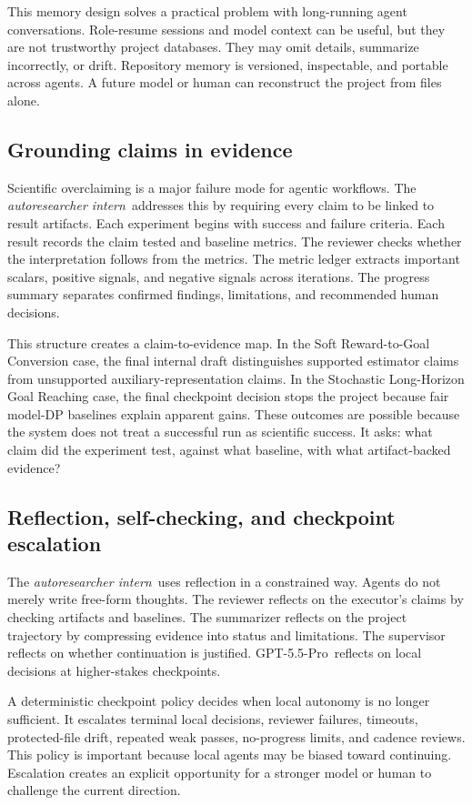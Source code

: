 \documentclass{article}
\newcommand{\intern}{\emph{autoresearcher intern}}
\newcommand{\gptpro}{GPT-5.5-Pro}
\begin{document}
This memory design solves a practical problem with long-running agent conversations. Role-resume sessions and model context can be useful, but they are not trustworthy project databases. They may omit details, summarize incorrectly, or drift. Repository memory is versioned, inspectable, and portable across agents. A future model or human can reconstruct the project from files alone.

\subsection{Grounding claims in evidence}

Scientific overclaiming is a major failure mode for agentic workflows. The \intern\ addresses this by requiring every claim to be linked to result artifacts. Each experiment begins with success and failure criteria. Each result records the claim tested and baseline metrics. The reviewer checks whether the interpretation follows from the metrics. The metric ledger extracts important scalars, positive signals, and negative signals across iterations. The progress summary separates confirmed findings, limitations, and recommended human decisions.

This structure creates a claim-to-evidence map. In the Soft Reward-to-Goal Conversion case, the final internal draft distinguishes supported estimator claims from unsupported auxiliary-representation claims. In the Stochastic Long-Horizon Goal Reaching case, the final checkpoint decision stops the project because fair model-DP baselines explain apparent gains. These outcomes are possible because the system does not treat a successful run as scientific success. It asks: what claim did the experiment test, against what baseline, with what artifact-backed evidence?

\subsection{Reflection, self-checking, and checkpoint escalation}

The \intern\ uses reflection in a constrained way. Agents do not merely write free-form thoughts. The reviewer reflects on the executor's claims by checking artifacts and baselines. The summarizer reflects on the project trajectory by compressing evidence into status and limitations. The supervisor reflects on whether continuation is justified. \gptpro\ reflects on local decisions at higher-stakes checkpoints.

A deterministic checkpoint policy decides when local autonomy is no longer sufficient. It escalates terminal local decisions, reviewer failures, timeouts, protected-file drift, repeated weak passes, no-progress limits, and cadence reviews. This policy is important because local agents may be biased toward continuing. Escalation creates an explicit opportunity for a stronger model or human to challenge the current direction.
\end{document}
